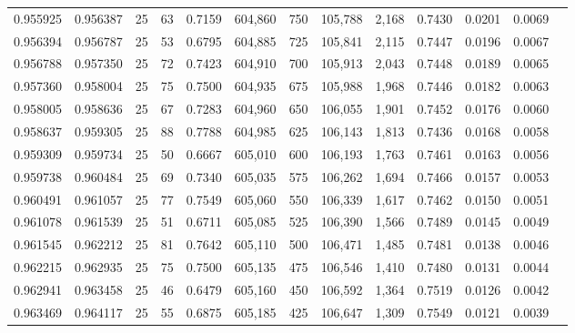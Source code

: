 \begin{tabular}{rrrrrrrrrrrrr}
0.955925 & 0.956387 &    25 &  63 &                                     0.7159 & 604,860 &     750 & 105,788 &   2,168 & 0.7430 & 0.0201 & 0.0069 \\
0.956394 & 0.956787 &    25 &  53 &                                     0.6795 & 604,885 &     725 & 105,841 &   2,115 & 0.7447 & 0.0196 & 0.0067 \\
0.956788 & 0.957350 &    25 &  72 &                                     0.7423 & 604,910 &     700 & 105,913 &   2,043 & 0.7448 & 0.0189 & 0.0065 \\
0.957360 & 0.958004 &    25 &  75 &                                     0.7500 & 604,935 &     675 & 105,988 &   1,968 & 0.7446 & 0.0182 & 0.0063 \\
0.958005 & 0.958636 &    25 &  67 &                                     0.7283 & 604,960 &     650 & 106,055 &   1,901 & 0.7452 & 0.0176 & 0.0060 \\
0.958637 & 0.959305 &    25 &  88 &                                     0.7788 & 604,985 &     625 & 106,143 &   1,813 & 0.7436 & 0.0168 & 0.0058 \\
0.959309 & 0.959734 &    25 &  50 &                                     0.6667 & 605,010 &     600 & 106,193 &   1,763 & 0.7461 & 0.0163 & 0.0056 \\
0.959738 & 0.960484 &    25 &  69 &                                     0.7340 & 605,035 &     575 & 106,262 &   1,694 & 0.7466 & 0.0157 & 0.0053 \\
0.960491 & 0.961057 &    25 &  77 &                                     0.7549 & 605,060 &     550 & 106,339 &   1,617 & 0.7462 & 0.0150 & 0.0051 \\
0.961078 & 0.961539 &    25 &  51 &                                     0.6711 & 605,085 &     525 & 106,390 &   1,566 & 0.7489 & 0.0145 & 0.0049 \\
0.961545 & 0.962212 &    25 &  81 &                                     0.7642 & 605,110 &     500 & 106,471 &   1,485 & 0.7481 & 0.0138 & 0.0046 \\
0.962215 & 0.962935 &    25 &  75 &                                     0.7500 & 605,135 &     475 & 106,546 &   1,410 & 0.7480 & 0.0131 & 0.0044 \\
0.962941 & 0.963458 &    25 &  46 &                                     0.6479 & 605,160 &     450 & 106,592 &   1,364 & 0.7519 & 0.0126 & 0.0042 \\
0.963469 & 0.964117 &    25 &  55 &                                     0.6875 & 605,185 &     425 & 106,647 &   1,309 & 0.7549 & 0.0121 & 0.0039 \\

\end{tabular}
